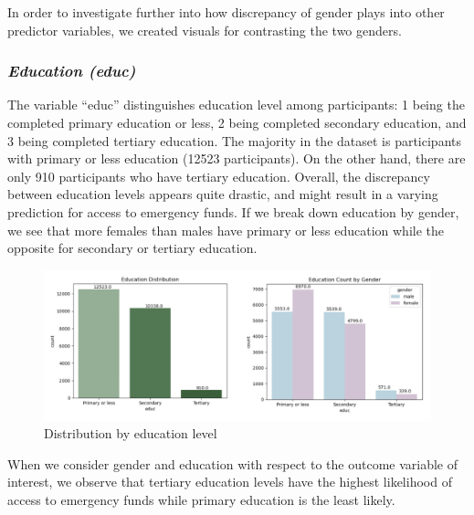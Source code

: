 \documentclass[12pt]{article}
\begin{document}
In order to investigate further into how discrepancy of gender plays
into other predictor variables, we created visuals for contrasting the
two genders.

\hypertarget{education-educ}{%
\subsubsection{\texorpdfstring{\emph{Education
(educ)}}{Education (educ)}}\label{education-educ}}

The variable ``educ'' distinguishes education level among participants:
1 being the completed primary education or less, 2 being completed
secondary education, and 3 being completed tertiary education. The
majority in the dataset is participants with primary or less education
(12523 participants). On the other hand, there are only 910 participants
who have tertiary education. Overall, the discrepancy between education
levels appears quite drastic, and might result in a varying prediction
for access to emergency funds. If we break down education by gender, we
see that more females than males have primary or less education while
the opposite for secondary or tertiary education.

\begin{figure}

{\centering \includegraphics[width=1\linewidth]{graphs/f24_graph4} 

}

\caption{Distribution by education level}\label{fig:unnamed-chunk-7}
\end{figure}

When we consider gender and education with respect to the outcome
variable of interest, we observe that tertiary education levels have the
highest likelihood of access to emergency funds while primary education
is the least likely.
\end{document}
